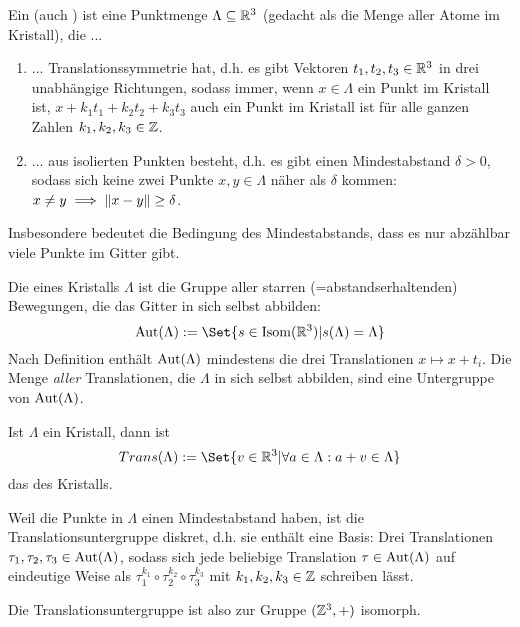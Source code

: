 
\begin{definition}[Kristalle]
Ein  (auch ) ist eine Punktmenge $\Lambda\subseteq\mathbb{R}^3$ (gedacht als die Menge aller Atome im Kristall), die ...
\begin{enumerate}
\item ... Translationssymmetrie hat, d.h. es gibt Vektoren $t_1,t_2,t_3\in\mathbb{R}^3$ in drei unabhängige Richtungen, sodass immer, wenn $x\in\Lambda$ ein Punkt im Kristall ist, $x+k_1 t_1+k_2t_2+k_3t_3$ auch ein Punkt im Kristall ist für alle ganzen Zahlen $k_1,k_2,k_3\in\mathbb{Z}$.
\item ... aus isolierten Punkten besteht, d.h. es gibt einen Mindestabstand $\delta>0$, sodass sich keine zwei Punkte $x,y\in\Lambda$ näher als $\delta$ kommen: $x\neq y \implies\lVert x-y\rVert\geq\delta$.
\end{enumerate}
\end{definition}

\begin{remark}
Insbesondere bedeutet die Bedingung des Mindestabstands, dass es nur abzählbar viele Punkte im Gitter gibt.
\end{remark}

\begin{definition}
Die  eines Kristalls $\Lambda$ ist die Gruppe aller starren (=abstandserhaltenden) Bewegungen, die das Gitter in sich selbst abbilden:
\[\Aut(\Lambda) := \Set{s\in \operatorname{Isom}(\IR^3) | s(\Lambda)=\Lambda}\]
Nach Definition enthält $\operatorname{Aut}(\Lambda)$ mindestens die drei Translationen $x\mapsto x+t_i$. Die Menge \emph{aller} Translationen, die $\Lambda$ in sich selbst abbilden, sind eine Untergruppe von $\operatorname{Aut}(\Lambda)$.
\end{definition}

\begin{definition}
Ist $\Lambda$ ein Kristall, dann ist
\[Trans(\Lambda) := \Set{v\in\IR^3 | \forall a\in\Lambda: a+v\in\Lambda}\]
das  des Kristalls.
\end{definition}

\begin{remark}
Weil die Punkte in $\Lambda$ einen Mindestabstand haben, ist die Translationsuntergruppe diskret, d.h. sie enthält eine Basis: Drei Translationen $\tau_1,\tau_2,\tau_3\in\operatorname{Aut}(\Lambda)$, sodass sich jede beliebige Translation $\tau\in\operatorname{Aut}(\Lambda)$ auf eindeutige Weise als $\tau_1^{k_1}\circ\tau_2^{k_2} \circ \tau_3^{k_3}$ mit $k_1,k_2,k_3\in\mathbb{Z}$ schreiben lässt.

Die Translationsuntergruppe ist also zur Gruppe $(\mathbb{Z}^3,+)$ isomorph.
\end{remark}


